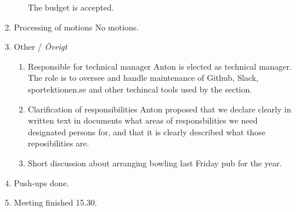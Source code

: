 \documentclass[12pt,a4paper]{article}
\begin{document}
\begin{enumerate}
\begin{itemize}
					The budget is accepted.
			\end{itemize}
		\item Processing of motions
			No motions.
		\item Other / \emph{Övrigt}
			\begin{enumerate}
				\item Responsible for technical manager
					Anton is elected as technical manager. The role is to oversee and handle maintenance of Github, Slack, sportektionen.se and other techincal tools used by the section.
				\item Clarification of responsibilities
					Anton proposed that we declare clearly in written text in documents what areas of responsbilities we need designated persons for, and that it is clearly described what those reposibilities are. %
				\item Short discussion about arranging bowling last Friday pub for the year.
			\end{enumerate}
		\item Push-ups done.
		\item Meeting finished 15.30.
	\end{enumerate}
\end{document}
